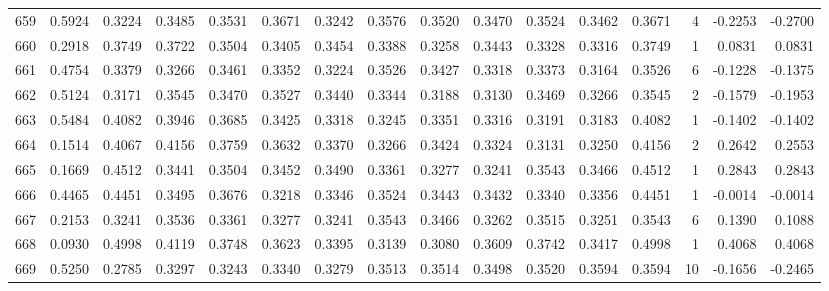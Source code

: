 \begin{tabular}{lrrrrrrrrrrrrrrr}
659 &      0.5924 &  0.3224 &  0.3485 &  0.3531 &  0.3671 &  0.3242 &  0.3576 &  0.3520 &  0.3470 &  0.3524 &   0.3462 &     0.3671 &      4 &                   -0.2253 &                    -0.2700 \\
660 &      0.2918 &  0.3749 &  0.3722 &  0.3504 &  0.3405 &  0.3454 &  0.3388 &  0.3258 &  0.3443 &  0.3328 &   0.3316 &     0.3749 &      1 &                    0.0831 &                     0.0831 \\
661 &      0.4754 &  0.3379 &  0.3266 &  0.3461 &  0.3352 &  0.3224 &  0.3526 &  0.3427 &  0.3318 &  0.3373 &   0.3164 &     0.3526 &      6 &                   -0.1228 &                    -0.1375 \\
662 &      0.5124 &  0.3171 &  0.3545 &  0.3470 &  0.3527 &  0.3440 &  0.3344 &  0.3188 &  0.3130 &  0.3469 &   0.3266 &     0.3545 &      2 &                   -0.1579 &                    -0.1953 \\
663 &      0.5484 &  0.4082 &  0.3946 &  0.3685 &  0.3425 &  0.3318 &  0.3245 &  0.3351 &  0.3316 &  0.3191 &   0.3183 &     0.4082 &      1 &                   -0.1402 &                    -0.1402 \\
664 &      0.1514 &  0.4067 &  0.4156 &  0.3759 &  0.3632 &  0.3370 &  0.3266 &  0.3424 &  0.3324 &  0.3131 &   0.3250 &     0.4156 &      2 &                    0.2642 &                     0.2553 \\
665 &      0.1669 &  0.4512 &  0.3441 &  0.3504 &  0.3452 &  0.3490 &  0.3361 &  0.3277 &  0.3241 &  0.3543 &   0.3466 &     0.4512 &      1 &                    0.2843 &                     0.2843 \\
666 &      0.4465 &  0.4451 &  0.3495 &  0.3676 &  0.3218 &  0.3346 &  0.3524 &  0.3443 &  0.3432 &  0.3340 &   0.3356 &     0.4451 &      1 &                   -0.0014 &                    -0.0014 \\
667 &      0.2153 &  0.3241 &  0.3536 &  0.3361 &  0.3277 &  0.3241 &  0.3543 &  0.3466 &  0.3262 &  0.3515 &   0.3251 &     0.3543 &      6 &                    0.1390 &                     0.1088 \\
668 &      0.0930 &  0.4998 &  0.4119 &  0.3748 &  0.3623 &  0.3395 &  0.3139 &  0.3080 &  0.3609 &  0.3742 &   0.3417 &     0.4998 &      1 &                    0.4068 &                     0.4068 \\
669 &      0.5250 &  0.2785 &  0.3297 &  0.3243 &  0.3340 &  0.3279 &  0.3513 &  0.3514 &  0.3498 &  0.3520 &   0.3594 &     0.3594 &     10 &                   -0.1656 &                    -0.2465 \\

\end{tabular}
